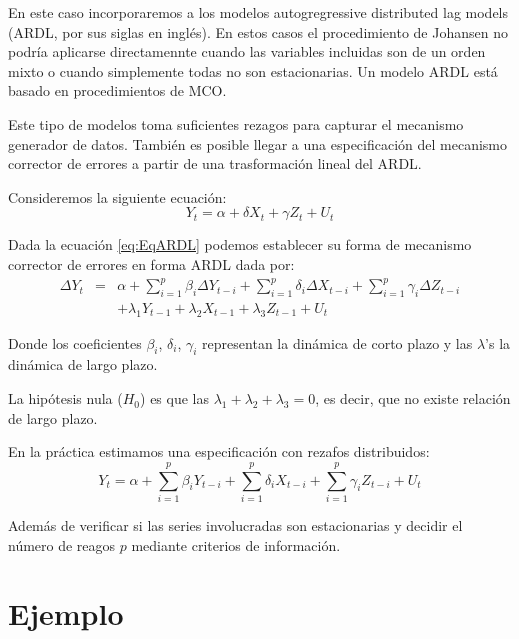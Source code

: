 \documentclass[
]{book}
\begin{document}
En este caso incorporaremos a los modelos autogregressive distributed lag models (ARDL, por sus siglas en inglés). En estos casos el procedimiento de Johansen no podría aplicarse directamennte cuando las variables incluidas son de un orden mixto o cuando simplemente todas no son estacionarias. Un modelo ARDL está basado en procedimientos de MCO.

Este tipo de modelos toma suficientes rezagos para capturar el mecanismo generador de datos. También es posible llegar a una especificación del mecanismo corrector de errores a partir de una trasformación lineal del ARDL.

Consideremos la siguiente ecuación:
\begin{equation}
    Y_t = \alpha + \delta X_t + \gamma Z_t + U_t
    \label{eq:EqARDL}
\end{equation}

Dada la ecuación \eqref{eq:EqARDL} podemos establecer su forma de mecanismo corrector de errores en forma ARDL dada por:
\begin{eqnarray*}
    \Delta Y_t & = & \alpha + \sum_{i = 1}^p \beta_i \Delta Y_{t-i} + \sum_{i = 1}^p \delta_i \Delta X_{t-i} + \sum_{i = 1}^p \gamma_i \Delta Z_{t-i} \\ 
    &  & + \lambda_1 Y_{t-1} + \lambda_2 X_{t-1} + \lambda_3 Z_{t-1} + U_t
\end{eqnarray*}

Donde los coeficientes \(\beta_i\), \(\delta_i\), \(\gamma_i\) representan la dinámica de corto plazo y las \(\lambda\)'s la dinámica de largo plazo.

La hipótesis nula (\(H_0\)) es que las \(\lambda_1 + \lambda_2 + \lambda_3 = 0\), es decir, que no existe relación de largo plazo.

En la práctica estimamos una especificación con rezafos distribuidos:
\begin{equation}
    Y_t = \alpha + \sum_{i = 1}^p \beta_i Y_{t-i} + \sum_{i = 1}^p \delta_i X_{t-i} + \sum_{i = 1}^p \gamma_i Z_{t-i} + U_t
\end{equation}

Además de verificar si las series involucradas son estacionarias y decidir el número de reagos \(p\) mediante criterios de información.

\hypertarget{ejemplo}{%
\section{Ejemplo}\label{ejemplo}}
\end{document}
